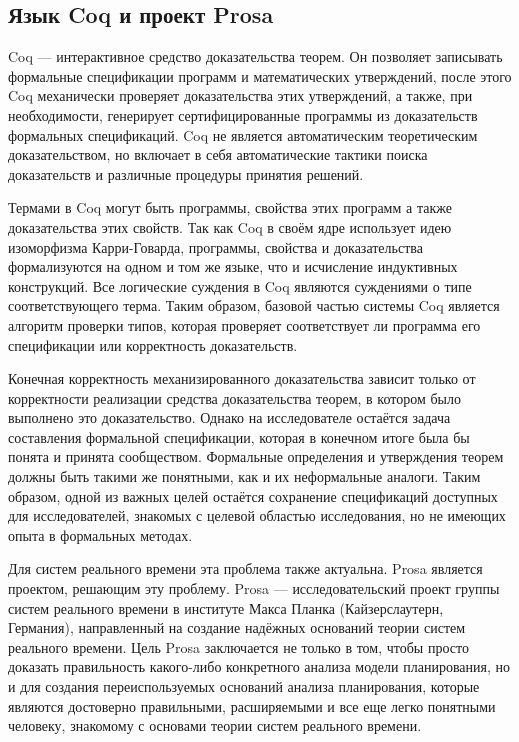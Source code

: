 \subsection{Язык Coq и проект Prosa}


Coq --- интерактивное средство доказательства теорем. Он позволяет записывать
  формальные спецификации программ и математических утверждений, после этого Coq механически
  проверяет доказательства этих утверждений, а также, при необходимости, генерирует сертифицированные
  программы из доказательств формальных спецификаций. Coq не является автоматическим
  теоретическим доказательством, но включает в себя автоматические
  тактики поиска доказательств и различные процедуры принятия решений.

Термами в Coq могут быть программы, свойства этих программ
  а также доказательства этих свойств. Так как Coq в своём ядре использует
  идею изоморфизма Карри-Говарда, программы, свойства и доказательства формализуются на
  одном и том же языке, что и исчисление индуктивных конструкций. Все логические суждения
  в Coq являются суждениями о типе
  соответствующего терма. Таким образом, базовой частью системы Coq является алгоритм
  проверки типов, которая проверяет соответствует ли программа его спецификации
  или корректность доказательств.

Конечная корректность механизированного доказательства зависит только от корректности
  реализации средства доказательства теорем, в котором было выполнено это доказательство.
  Однако на исследователе остаётся задача составления
  формальной спецификации, которая в конечном итоге была бы понята и принята сообществом.
  Формальные определения и утверждения теорем должны быть такими же понятными,
  как и их неформальные аналоги. Таким образом, одной из важных целей остаётся сохранение
  спецификаций доступных для исследователей, знакомых с целевой областью исследования, но не
  имеющих опыта в формальных методах.

Для систем реального времени эта проблема также актуальна. Prosa является проектом,
  решающим эту проблему. Prosa --- исследовательский проект группы
  систем реального времени в институте Макса Планка (Кайзерслаутерн, Германия),
  направленный на создание надёжных оснований теории систем реального времени.
  Цель Prosa заключается не только в том, чтобы просто доказать правильность какого-либо
  конкретного анализа модели планирования, но и для создания переиспользуемых оснований
  анализа планирования, которые являются достоверно правильными, расширяемыми и
  все еще легко понятными человеку, знакомому с основами теории систем реального времени.

